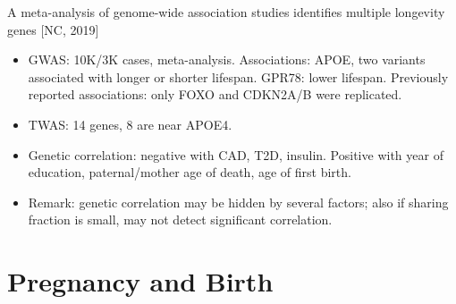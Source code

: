 \documentclass{report}
\begin{document}
A meta-analysis of genome-wide association studies identifies multiple longevity genes [NC, 2019]
\begin{itemize}
	\item GWAS: 10K/3K cases, meta-analysis. Associations: APOE, two variants associated with longer or shorter lifespan. GPR78: lower lifespan. Previously reported associations: only FOXO and CDKN2A/B were replicated.
	
	\item TWAS: 14 genes, 8 are near APOE4.
	
	\item Genetic correlation: negative with CAD, T2D, insulin. Positive with year of education, paternal/mother age of death, age of first birth.
	
	\item Remark: genetic correlation may be hidden by several factors; also if sharing fraction is small, may not detect significant correlation.
\end{itemize}
\section{Pregnancy and Birth}
\end{document}
